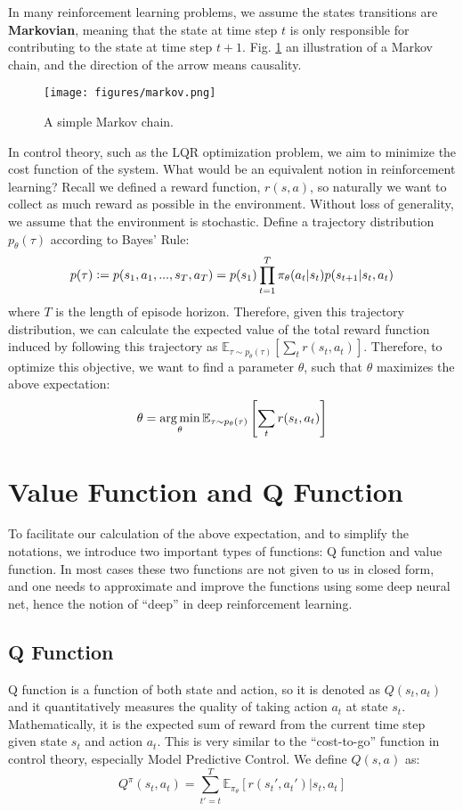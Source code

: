 In many reinforcement learning problems, we assume the states transitions are \textbf{Markovian}, meaning that the state at time step $t$ is only responsible for contributing to the state at time step $t+1$.
Fig. \ref{fig:markov} an illustration of a Markov chain, and the direction of the arrow means causality.
\begin{figure}
    \centering
    \texttt{[image: figures/markov.png]}
    \caption{A simple Markov chain.}
    \label{fig:markov}
\end{figure}

In control theory, such as the LQR optimization problem, we aim to minimize the cost function of the system. What would be an equivalent notion in reinforcement learning? Recall we defined a reward function, $r(s,a)$, so naturally we want to collect as much reward as possible in the environment. Without loss of generality, we assume that the environment is stochastic. Define a trajectory distribution $p_\theta(\tau)$ according to Bayes' Rule:
$$ p(\tau) \vcentcolon= p(s_1,a_1,...,s_T,a_T) = p(s_1)\prod_{t=1}^T\pi_\theta(a_t|s_t)p(s_{t+1}|s_t,a_t)$$
where $T$ is the length of episode horizon. Therefore, given this trajectory distribution, we can calculate the expected value of the total reward function induced by following this trajectory as $\mathbb{E}_{\tau\sim p_\theta(\tau)}\left[\sum_t r(s_t,a_t)\right]$. Therefore, to optimize this objective, we want to find a parameter $\theta$, such that $\theta$ maximizes the above expectation:
$$\theta = \operatorname*{arg\,min}_\theta\mathbb{E}_{\tau\sim p_\theta(\tau)}\left[\sum_t r(s_t,a_t)\right]$$
\section{Value Function and Q Function}
To facilitate our calculation of the above expectation, and to simplify the notations, we introduce two important types of functions: Q function and value function. In most cases these two functions are not given to us in closed form, and one needs to approximate and improve the functions using some deep neural net, hence the notion of ``deep'' in deep reinforcement learning.
\subsection{Q Function}
Q function is a function of both state and action, so it is denoted as $Q(s_t,a_t)$ and it quantitatively measures the quality of taking action $a_t$ at state $s_t$. Mathematically, it is the expected sum of reward from the current time step given state $s_t$ and action $a_t$. This is very similar to the ``cost-to-go'' function in control theory, especially Model Predictive Control. We define $Q(s,a)$ as:
$$Q^\pi(s_t,a_t) = \sum_{t'=t}^T{\mathbb{E}_{\pi_\theta}[r(s_t',a_t')|s_t,a_t]}$$
